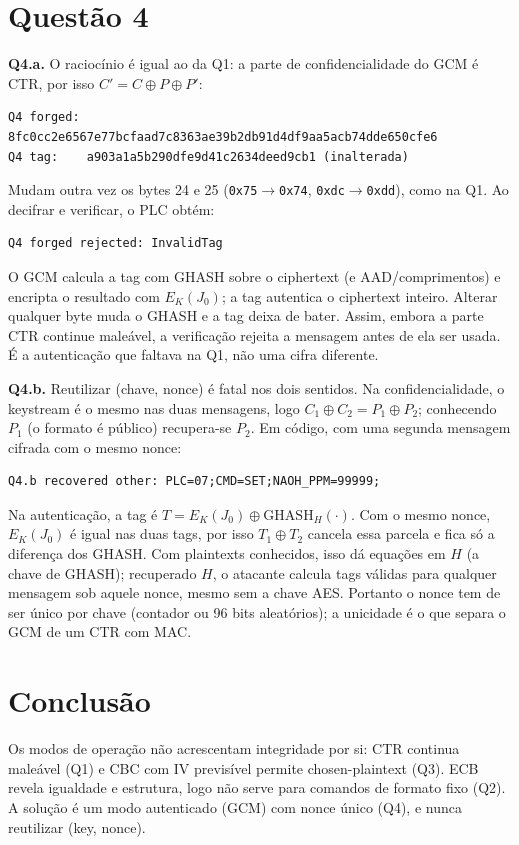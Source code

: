 \documentclass[11pt,a4paper]{article}
\begin{document}
\section*{Questão 4}

\textbf{Q4.a.} O raciocínio é igual ao da Q1: a parte de confidencialidade do
GCM é CTR, por isso
$C' = C \oplus P \oplus P'$:

\begin{verbatim}
Q4 forged: 8fc0cc2e6567e77bcfaad7c8363ae39b2db91d4df9aa5acb74dde650cfe6
Q4 tag:    a903a1a5b290dfe9d41c2634deed9cb1 (inalterada)
\end{verbatim}

Mudam outra vez os bytes 24 e 25 (\texttt{0x75}$\to$\texttt{0x74},
\texttt{0xdc}$\to$\texttt{0xdd}), como na Q1. Ao decifrar e verificar, o PLC
obtém:

\begin{verbatim}
Q4 forged rejected: InvalidTag
\end{verbatim}

O GCM calcula a tag com GHASH sobre o ciphertext (e AAD/comprimentos) e
encripta o resultado com $E_K(J_0)$; a tag autentica o ciphertext inteiro.
Alterar qualquer byte muda o GHASH e a tag deixa de bater. Assim, embora a
parte CTR continue maleável, a verificação rejeita a mensagem antes de ela ser
usada. É a autenticação que faltava na Q1, não uma cifra diferente.

\textbf{Q4.b.} Reutilizar (chave, nonce) é fatal nos dois sentidos.
Na confidencialidade, o keystream é o mesmo nas duas mensagens, logo
$C_1 \oplus C_2 = P_1 \oplus P_2$; conhecendo $P_1$ (o formato é público)
recupera-se $P_2$. Em código, com uma segunda mensagem cifrada com o mesmo
nonce:

\begin{verbatim}
Q4.b recovered other: PLC=07;CMD=SET;NAOH_PPM=99999;
\end{verbatim}

Na autenticação, a tag é $T = E_K(J_0) \oplus \mathrm{GHASH}_H(\cdot)$. Com o
mesmo nonce, $E_K(J_0)$ é igual nas duas tags, por isso $T_1 \oplus T_2$ cancela
essa parcela e fica só a diferença dos GHASH. Com plaintexts conhecidos, isso
dá equações em $H$ (a chave de GHASH); recuperado $H$, o atacante calcula tags
válidas para qualquer mensagem sob aquele nonce, mesmo sem a chave AES. Portanto
o nonce tem de ser único por chave (contador ou 96 bits aleatórios); a
unicidade é o que separa o GCM de um CTR com MAC.

\section*{Conclusão}

Os modos de operação não acrescentam integridade por si: CTR continua maleável
(Q1) e CBC com IV previsível permite chosen-plaintext (Q3). ECB revela
igualdade e estrutura, logo não serve para comandos de formato fixo (Q2). A
solução é um modo autenticado (GCM) com nonce único (Q4), e nunca reutilizar
(key, nonce).
\end{document}
